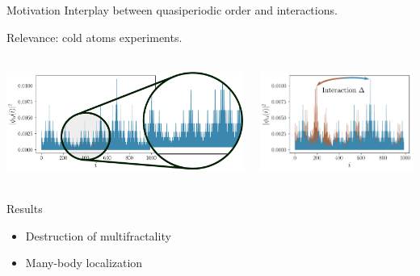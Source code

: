 \begin{frame}{Motivation}
Interplay between quasiperiodic order and interactions.

Relevance: cold atoms experiments.

\begin{columns}
\begin{column}{0.6\textwidth}
\centering
%
\includegraphics[height=3.5cm]{img/0_cover/one_density_zoom}
\end{column}
\begin{column}{0.4\textwidth}
\centering
\includegraphics[height=3.5cm]{img/0_cover/free_two_densities_interaction}
\end{column}
\end{columns}
\begin{block}{Results}
\begin{itemize}
	\item Destruction of multifractality
	\item Many-body localization
\end{itemize}
\end{block}
\end{frame}

